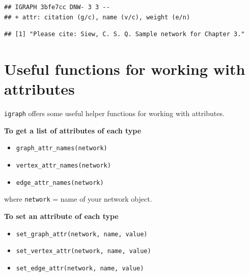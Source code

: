 \documentclass[
]{book}
\newenvironment{Shaded}{\begin{snugshade}}{\end{snugshade}}
\newcommand{\CommentTok}[1]{\textcolor[rgb]{0.56,0.35,0.01}{\textit{#1}}}
\newcommand{\FunctionTok}[1]{\textcolor[rgb]{0.13,0.29,0.53}{\textbf{#1}}}
\newcommand{\NormalTok}[1]{#1}
\newcommand{\OtherTok}[1]{\textcolor[rgb]{0.56,0.35,0.01}{#1}}
\newcommand{\SpecialCharTok}[1]{\textcolor[rgb]{0.81,0.36,0.00}{\textbf{#1}}}
\newcommand{\StringTok}[1]{\textcolor[rgb]{0.31,0.60,0.02}{#1}}
\providecommand{\tightlist}{%
  \setlength{\itemsep}{0pt}\setlength{\parskip}{0pt}}
\begin{document}
\begin{Shaded}
\end{Shaded}

\begin{verbatim}
## IGRAPH 3bfe7cc DNW- 3 3 -- 
## + attr: citation (g/c), name (v/c), weight (e/n)
\end{verbatim}

\begin{Shaded}
\end{Shaded}

\begin{verbatim}
## [1] "Please cite: Siew, C. S. Q. Sample network for Chapter 3."
\end{verbatim}

\section{Useful functions for working with attributes}\label{useful-functions-for-working-with-attributes}

\texttt{igraph} offers some useful helper functions for working with attributes.

\textbf{To get a list of attributes of each type}

\begin{itemize}
\tightlist
\item
  \texttt{graph\_attr\_names(network)}
\item
  \texttt{vertex\_attr\_names(network)}
\item
  \texttt{edge\_attr\_names(network)}
\end{itemize}

where \texttt{network} = name of your network object.

\textbf{To set an attribute of each type}

\begin{itemize}
\tightlist
\item
  \texttt{set\_graph\_attr(network,\ name,\ value)}
\item
  \texttt{set\_vertex\_attr(network,\ name,\ value)}
\item
  \texttt{set\_edge\_attr(network,\ name,\ value)}
\end{itemize}
\end{document}
